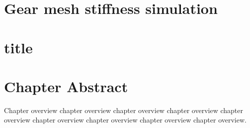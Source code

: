 \section{Gear mesh stiffness simulation}






\section{}


\section{title}

\section{Chapter Abstract}

Chapter overview chapter overview chapter overview chapter overview
chapter overview chapter overview chapter overview chapter overview
chapter overview.


